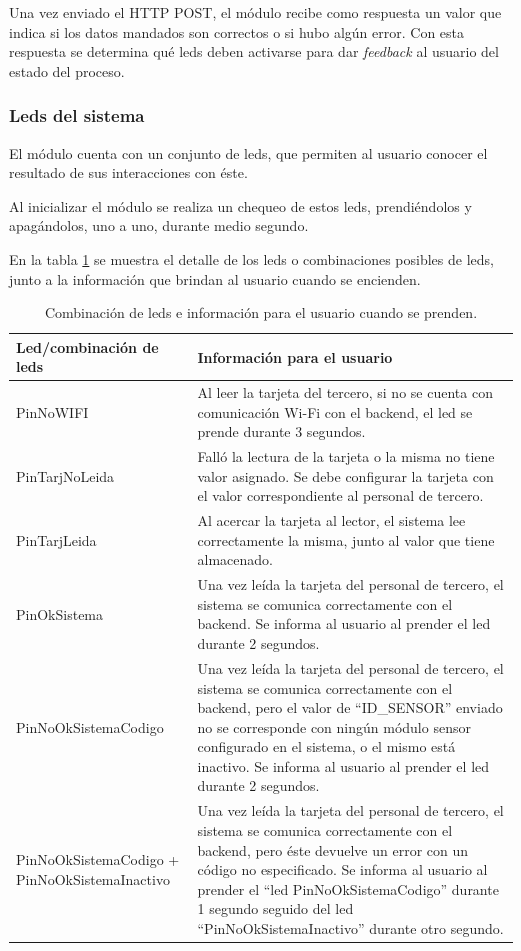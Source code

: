Una vez enviado el HTTP POST, el módulo recibe como respuesta un valor que indica si los datos mandados son correctos o si hubo algún error. Con esta respuesta se determina qué leds deben activarse para dar \textit{feedback} al usuario del estado del proceso.

\subsubsection{Leds del sistema}

El módulo cuenta con un conjunto de leds, que permiten al usuario conocer el resultado de sus interacciones con éste.

Al inicializar el módulo se realiza un chequeo de estos leds, prendiéndolos y apagándolos, uno a uno, durante medio segundo.

En la tabla \ref{tab:combinacionLedsSensor} se muestra el detalle de los leds o combinaciones posibles de leds, junto a la información que brindan al usuario cuando se encienden.

\begin{table}[h]
	\centering
	\caption[Leds del módulo sensor]{Combinación de leds e información para el usuario cuando se prenden.}
	\begin{tabular}{p{4cm} p{8.5cm} } 	

		\toprule
		\textbf{Led/combinación de leds} & 
		\textbf{Información para el usuario}
		\\
		\midrule

PinNoWIFI & Al leer la tarjeta del tercero, si no se cuenta con comunicación Wi-Fi con el backend, el led se prende durante 3 segundos.\\ 
PinTarjNoLeida & Falló la lectura de la tarjeta o la misma no tiene valor asignado. Se debe configurar la tarjeta con el valor correspondiente al personal de tercero.\\
PinTarjLeida & Al acercar la tarjeta al lector, el sistema lee correctamente la misma, junto al valor que tiene almacenado.\\
PinOkSistema & Una vez leída la tarjeta del personal de tercero, el sistema se comunica correctamente con el backend. Se informa al usuario al prender el led durante 2 segundos. \\
PinNoOkSistemaCodigo & Una vez leída la tarjeta del personal de tercero, el sistema se comunica correctamente con el backend, pero el valor de ``ID\_SENSOR'' enviado no se corresponde con ningún módulo sensor configurado en el sistema, o el mismo está inactivo. Se informa al usuario al prender el led durante 2 segundos. \\
PinNoOkSistemaCodigo
+
PinNoOkSistemaInactivo & Una vez leída la tarjeta del personal de tercero, el sistema se comunica correctamente con el backend, pero éste devuelve un error con un código no especificado. Se informa al usuario al prender el ``led PinNoOkSistemaCodigo'' durante 1 segundo seguido del led ``PinNoOkSistemaInactivo'' durante otro segundo.
\\
		\bottomrule
		\hline
	\end{tabular}
	\label{tab:combinacionLedsSensor}
\end{table}


